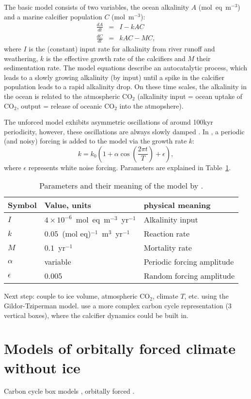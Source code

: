 \documentclass[12pt]{article}
\def\be{\begin{equation}}
\def\ee{\end{equation}}
\def\ba{\begin{eqnarray}}
\def\ea{\end{eqnarray}}
\begin{document}
The basic model consists of two variables, the ocean alkalinity $A$ (mol~eq~m$^{-3}$) and a marine calcifier population $C$ (mol~m$^{-3}$):
\ba
\frac{d A}{dt} &=& I - kAC\\
\frac{d C}{dt} &=& kAC - MC,
\label{e:Om13}
\ea
where $I$ is the (constant) input rate for alkalinity from river runoff and weathering, $k$ is the effective growth rate of the calcifiers and $M$ their sedimentation rate. The model equations describe an autocatalytic process, which leads to a slowly growing alkalinity (by input) until a spike in the calcifier population leads to a rapid alkalinity drop. On these time scales, the alkalinity in the ocean is related to the atmospheric CO$_2$ (alkalinity input = ocean uptake of CO$_2$, output = release of oceanic CO$_2$ into the atmopshere). 

The unforced model exhibits asymmetric oscillations of around 100kyr periodicity, however, these oscillations are always slowly damped \cite{Omta:2013dl}. In \cite{Omta:2015cc}, a periodic (and noisy) forcing is added to the model via the growth rate $k$:
\be
k = k_0\left(1+\alpha\cos{\left(\frac{2\pi t}{T}\right)}+\epsilon\right),
\ee
where $\epsilon$ represents white noise forcing. Parameters are explained in Table~\ref{t:Om15}.

\begin{table}[h!]
\small{
\begin{tabular}{lll}
\hline
Symbol & Value, units & physical meaning\\
\hline
$I$ & $4\times 10^{-6}$~mol~eq~m$^{-3}$~yr$^{-1}$ & Alkalinity input\\
$k$ & $0.05$~(mol eq)$^{-1}$~m$^3$~yr$^{-1}$ & Reaction rate \\
$M$ & $0.1$~yr$^{-1}$ & Mortality rate\\
$\alpha$ & variable & Periodic forcing amplitude\\
$\epsilon$ & 0.005 & Random forcing amplitude\\
\hline
\end{tabular}}
\label{t:Om15}
\caption{Parameters and their meaning of the model by \cite{Omta:2015cc}.}
\end{table}


{\color{red} Next step: couple to ice volume, atmospheric CO$_2$, climate $T$, etc. using the Gildor-Tziperman model. \cite{Wallmann:2014dc} use a more complex carbon cycle representation (3 vertical boxes), where the calcifier dynamics could be built in. } 


\newpage
\section{Models of orbitally forced climate without ice}
Carbon cycle box models \cite{Zeebe:2012gi}, orbitally forced \cite{Zeebe:2017kk}.

\newpage


\end{document}
